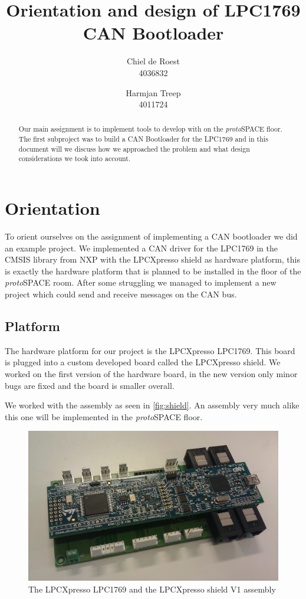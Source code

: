 \documentclass[twocolumn]{article}
\title{Orientation and design of LPC1769 CAN Bootloader}
\author{Chiel de Roest\\4036832 \and Harmjan Treep\\4011724}
\date{}
\newcommand{\protospace}{\textit{proto}SPACE }
\begin{document}
\maketitle

\begin{abstract}
	Our main assignment is to implement tools to develop with on the \protospace floor.
	The first subproject was to build a CAN Bootloader for the LPC1769 and in this document will we discuss how we approached the problem and what design considerations we took into account.
\end{abstract}

\section*{Orientation}
	To orient ourselves on the assignment of implementing a CAN bootloader we did an example project.
	We implemented a CAN driver for the LPC1769 in the CMSIS library from NXP with the LPCXpresso shield as hardware platform,
	this is exactly the hardware platform that is planned to be installed in the floor of the \protospace room.
	After some struggling we managed to implement a new project which could send and receive messages on the CAN bus.
	
	\subsection*{Platform}
		The hardware platform for our project is the LPCXpresso LPC1769.
		This board is plugged into a custom developed board called the LPCXpresso shield.
		We worked on the first version of the hardware board,
		in the new version only minor bugs are fixed and the board is smaller overall.
		
		We worked with the assembly as seen in \autoref{fig:shield}.
		An assembly very much alike this one will be implemented in the \protospace floor.
		\begin{figure}[htbp]
			\centering
			\includegraphics[width=\columnwidth]{LPCXpressoShieldAssembly}
			\caption{The LPCXpresso LPC1769 and the LPCXpresso shield V1 assembly}
			\label{fig:shield}
		\end{figure}
	
\end{document}
